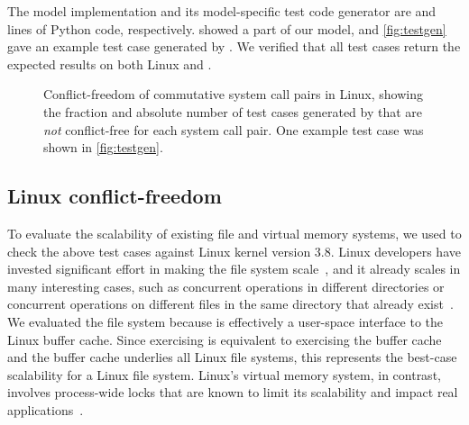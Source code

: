 The model implementation and its model-specific test code generator
are  and
 lines of Python code,
respectively.
 showed a part of our
model, and \cref{fig:testgen} gave an example test
case generated by \tool{}.  We verified that all test cases return
the expected results on both Linux and \sys.

% 
\begin{figure*}
\small
\centering
{}
\caption[Conflict-freedom of commutative system call pairs in Linux.]{
  Conflict-freedom of commutative system call pairs in Linux, showing
  the fraction and absolute number of test cases generated by \tool
  that are \emph{not} conflict-free for each system call pair.  One
  example test case was shown in \cref{fig:testgen}.}
\label{fig:testcase-breakdown-linux}
\end{figure*}


\subsection{Linux conflict-freedom}

To evaluate the scalability of existing file and virtual memory systems,
we used \mtrace{} to check the above test cases against
Linux kernel version 3.8.
Linux developers have invested significant effort in making the file
system scale~\cite{boyd-wickizer:scaling}, and it already scales in
many interesting cases, such as concurrent operations in different
directories or concurrent operations on different files in the same
directory that already exist~\cite{lwn:dcache}.
%
We evaluated the  file system because
 is effectively a user-space interface to the Linux buffer
cache.  Since exercising  is equivalent to exercising the
buffer cache and the buffer cache underlies all Linux file
systems, this represents the best-case scalability for a Linux file
system.
%
Linux's virtual memory system, in contrast, involves process-wide
locks that are known to limit its
scalability and impact real
applications~\cite{boyd-wickizer:scaling,clements:bonsai,gil:c4}.

